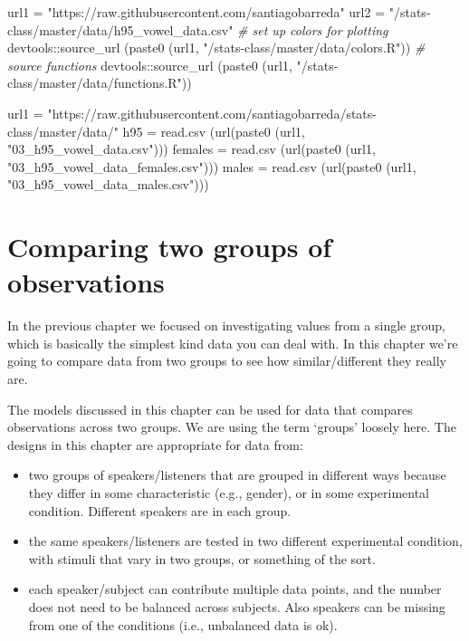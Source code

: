 \documentclass[
]{book}
\newenvironment{Shaded}{\begin{snugshade}}{\end{snugshade}}
\newcommand{\CommentTok}[1]{\textcolor[rgb]{0.56,0.35,0.01}{\textit{#1}}}
\newcommand{\FunctionTok}[1]{\textcolor[rgb]{0.00,0.00,0.00}{#1}}
\newcommand{\NormalTok}[1]{#1}
\newcommand{\OtherTok}[1]{\textcolor[rgb]{0.56,0.35,0.01}{#1}}
\newcommand{\SpecialCharTok}[1]{\textcolor[rgb]{0.00,0.00,0.00}{#1}}
\newcommand{\StringTok}[1]{\textcolor[rgb]{0.31,0.60,0.02}{#1}}
\begin{document}
\begin{Shaded}
\begin{Highlighting}[]
\NormalTok{url1 }\OtherTok{=} \StringTok{"https://raw.githubusercontent.com/santiagobarreda"}
\NormalTok{url2 }\OtherTok{=} \StringTok{"/stats{-}class/master/data/h95\_vowel\_data.csv"}
\CommentTok{\# set up colors for plotting}
\NormalTok{devtools}\SpecialCharTok{::}\FunctionTok{source\_url}\NormalTok{ (}\FunctionTok{paste0}\NormalTok{ (url1, }\StringTok{"/stats{-}class/master/data/colors.R"}\NormalTok{))}
\CommentTok{\# source functions}
\NormalTok{devtools}\SpecialCharTok{::}\FunctionTok{source\_url}\NormalTok{ (}\FunctionTok{paste0}\NormalTok{ (url1, }\StringTok{"/stats{-}class/master/data/functions.R"}\NormalTok{))}

\NormalTok{url1 }\OtherTok{=} \StringTok{"https://raw.githubusercontent.com/santiagobarreda/stats{-}class/master/data/"}
\NormalTok{h95 }\OtherTok{=} \FunctionTok{read.csv}\NormalTok{ (}\FunctionTok{url}\NormalTok{(}\FunctionTok{paste0}\NormalTok{ (url1, }\StringTok{"03\_h95\_vowel\_data.csv"}\NormalTok{)))}
\NormalTok{females }\OtherTok{=} \FunctionTok{read.csv}\NormalTok{ (}\FunctionTok{url}\NormalTok{(}\FunctionTok{paste0}\NormalTok{ (url1, }\StringTok{"03\_h95\_vowel\_data\_females.csv"}\NormalTok{)))}
\NormalTok{males }\OtherTok{=} \FunctionTok{read.csv}\NormalTok{ (}\FunctionTok{url}\NormalTok{(}\FunctionTok{paste0}\NormalTok{ (url1, }\StringTok{"03\_h95\_vowel\_data\_males.csv"}\NormalTok{)))}
\end{Highlighting}
\end{Shaded}

\hypertarget{comparing-two-groups-of-observations}{%
\chapter{Comparing two groups of observations}\label{comparing-two-groups-of-observations}}

In the previous chapter we focused on investigating values from a single group, which is basically the simplest kind data you can deal with. In this chapter we're going to compare data from two groups to see how similar/different they really are.

The models discussed in this chapter can be used for data that compares observations across two groups. We are using the term `groups' loosely here. The designs in this chapter are appropriate for data from:

\begin{itemize}
\item
  two groups of speakers/listeners that are grouped in different ways because they differ in some characteristic (e.g., gender), or in some experimental condition. Different speakers are in each group.
\item
  the same speakers/listeners are tested in two different experimental condition, with stimuli that vary in two groups, or something of the sort.
\item
  each speaker/subject can contribute multiple data points, and the number does not need to be balanced across subjects. Also speakers can be missing from one of the conditions (i.e., unbalanced data is ok).
\end{itemize}
\end{document}
